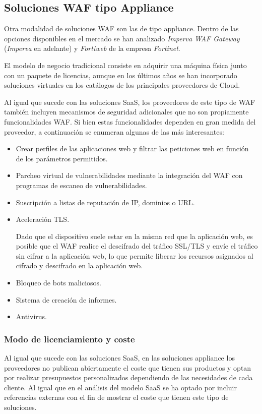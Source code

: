 \subsection{Soluciones WAF tipo Appliance}
\par Otra modalidad de soluciones WAF son las de tipo appliance. Dentro de las opciones disponibles en el mercado se han analizado {\em Imperva
WAF Gateway\cite{imperva}} ({\em Imperva} en adelante) y {\em Fortiweb\cite{fortiweb}} de la empresa {\em Fortinet\cite{fortinet}}.
\par El modelo de negocio tradicional consiste en adquirir una máquina física junto con un paquete de licencias, aunque en los últimos años se han
incorporado soluciones virtuales en los catálogos de los principales proveedores de Cloud.
\par Al igual que sucede con las soluciones SaaS, los proveedores de este tipo de WAF también incluyen mecanismos de seguridad adicionales que
no son propiamente funcionalidades WAF. Si bien estas funcionalidades dependen en gran medida del proveedor, a continuación se enumeran algunas
de las más interesantes:
\begin{itemize}
  \item Crear perfiles de las aplicaciones web y filtrar las peticiones web en función de los parámetros permitidos.
  \item Parcheo virtual de vulnerabilidades mediante la integración del WAF con programas de escaneo de vulnerabilidades.
  \item Suscripción a listas de reputación de IP, dominios o URL.
  \item Aceleración TLS.
    \par Dado que el dispositivo suele estar en la misma red que la aplicación web, es posible que el WAF realice el descifrado del tráfico
    SSL/TLS y envíe el tráfico sin cifrar a la aplicación web, lo que permite liberar los recursos asignados al cifrado y descifrado en la
    aplicación web.
  \item Bloqueo de bots maliciosos.
  \item Sistema de creación de informes.
  \item Antivirus.
\end{itemize}

\subsubsection{Modo de licenciamiento y coste}
\par Al igual que sucede con las soluciones SaaS, en las soluciones appliance los proveedores no publican abiertamente el coste que tienen sus
productos y optan por realizar presupuestos personalizados dependiendo de las necesidades de cada cliente. Al igual que en el análisis del
modelo SaaS se ha optado por incluir referencias externas con el fin de mostrar el coste que tienen este tipo de soluciones.

